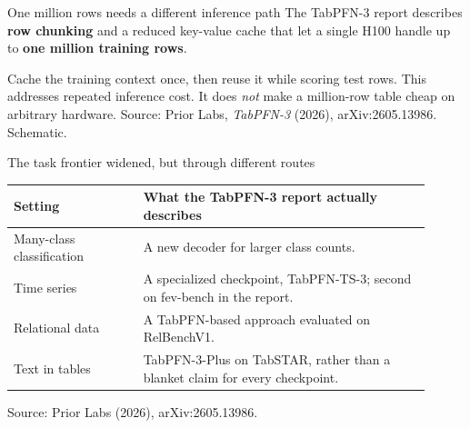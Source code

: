 \documentclass[aspectratio=169]{beamer}
\begin{document}
\begin{frame}{One million rows needs a different inference path}
  \small
  The TabPFN-3 report describes \textbf{row chunking} and a reduced key-value cache
  that let a single H100 handle up to \textbf{one million training rows}.
  \vskip 10pt
  \begin{center}
  \end{center}
  \vskip 7pt
  Cache the training context once, then reuse it while scoring test rows. This addresses
  repeated inference cost. It does \emph{not} make a million-row table cheap on arbitrary hardware.
  \vskip 4pt
  {\scriptsize Source: Prior Labs, \emph{TabPFN-3} (2026), arXiv:2605.13986. Schematic.}
\end{frame}

\begin{frame}{The task frontier widened, but through different routes}
  \small
  \begin{tabular}{L{0.29\linewidth}L{0.62\linewidth}}
    \textbf{Setting} & \textbf{What the TabPFN-3 report actually describes}\\[3pt]\hline
    Many-class classification & A new decoder for larger class counts.\\[4pt]
    Time series & A specialized checkpoint, TabPFN-TS-3; second on fev-bench in the report.\\[4pt]
    Relational data & A TabPFN-based approach evaluated on RelBenchV1.\\[4pt]
    Text in tables & TabPFN-3-Plus on TabSTAR, rather than a blanket claim for every checkpoint.
  \end{tabular}
  \vskip 11pt
  \vskip 4pt
  {\scriptsize Source: Prior Labs (2026), arXiv:2605.13986.}
\end{frame}
\end{document}
